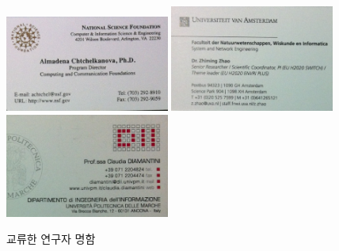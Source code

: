 \documentclass[twocolumn]{article}
\begin{document}
\begin{figure}[htb]
        \centering
        \includegraphics[width=0.48\textwidth]{nc01.png}
        \includegraphics[width=0.48\textwidth]{nc02.png}
        \includegraphics[width=0.48\textwidth]{nc03.png}
        \caption{교류한 연구자 명함}
        \label{fig:namecards01}
\end{figure}
\end{document}
